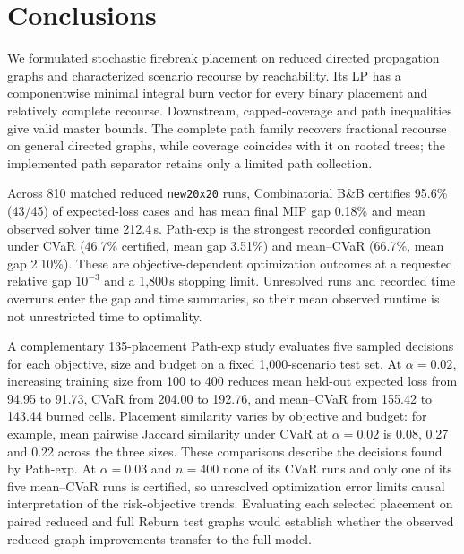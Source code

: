 \section{Conclusions}\label{sec:conclusions}

We formulated stochastic firebreak placement on reduced directed
propagation graphs and characterized scenario recourse by reachability.
Its LP has a componentwise minimal integral burn vector for every
binary placement and relatively complete recourse. Downstream,
capped-coverage and path inequalities give valid master bounds. The
complete path family recovers fractional recourse on general directed
graphs, while coverage coincides with it on rooted trees; the
implemented path separator retains only a limited path collection.

Across 810 matched reduced \texttt{new20x20} runs, Combinatorial
B\&B certifies 95.6\% (43/45) of expected-loss cases and has mean final MIP gap
0.18\% and mean observed solver time 212.4\,s. Path-exp is the
strongest recorded configuration under CVaR (46.7\% certified, mean
gap 3.51\%) and mean--CVaR (66.7\%, mean gap 2.10\%). These are
objective-dependent optimization outcomes at a requested relative
gap $10^{-3}$ and a 1,800\,s stopping limit. Unresolved runs and
recorded time overruns enter the gap and time summaries, so their
mean observed runtime is not unrestricted time to optimality.

A complementary 135-placement Path-exp study evaluates five sampled
decisions for each objective, size and budget on a fixed 1,000-scenario
test set. At $\alpha=0.02$, increasing training size from 100 to 400
reduces mean held-out expected loss from 94.95 to 91.73, CVaR from
204.00 to 192.76, and mean--CVaR from 155.42 to 143.44 burned cells.
Placement similarity varies by objective and budget: for example,
mean pairwise Jaccard similarity under CVaR at $\alpha=0.02$ is
0.08, 0.27 and 0.22 across the three sizes. These comparisons describe
the decisions found by Path-exp. At $\alpha=0.03$ and $n=400$ none
of its CVaR runs and only one of its five mean--CVaR runs is certified,
so unresolved optimization error limits causal interpretation of the
risk-objective trends. Evaluating each selected placement on paired
reduced and full Reburn test graphs would establish whether the
observed reduced-graph improvements transfer to the full model.
